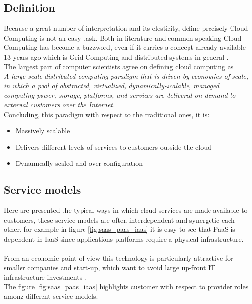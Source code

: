 \subsection{Definition}
Because a great number of interpretation and its elesticity, define precisely Cloud Computing is not an easy task. Both in literature and common speaking Cloud Computing has become a buzzword, even if it carries a concept already available 13 years ago which is Grid Computing and distributed systems in general \cite{foster}.\\
The largest part of computer scientists agree on defining cloud computing as\\
\textit{A large-scale distributed computing paradigm that is driven by economies of scale, in which a pool of abstracted, virtualized, dynamically-scalable, managed computing power, storage, platforms, and services are delivered on demand to external customers over the Internet.}\\
Concluding, this paradigm with respect to the traditional ones, it is: \cite{foster}
\begin{itemize}
    \item Massively scalable
    \item Delivers different levels of services to customers outside the cloud
    \item Dynamically scaled and over configuration
\end{itemize}

\subsection{Service models}
Here are presented the typical ways in which cloud services are made available to customers, these service models are often interdependent and synergetic each other, for example in figure \ref{fig:saas_paas_iaas} it is easy to see that PaaS is dependent in IaaS since applications platforms require a physical infrastructure.\\ \\
From an economic point of view this technology is particularly attractive for smaller companies and start-up, which want to avoid large up-front IT infrastructure investments \cite{CloudComputingModels}.\\
The figure \ref{fig:saas_paas_iaas} highlights customer with respect to provider roles among different service models.

